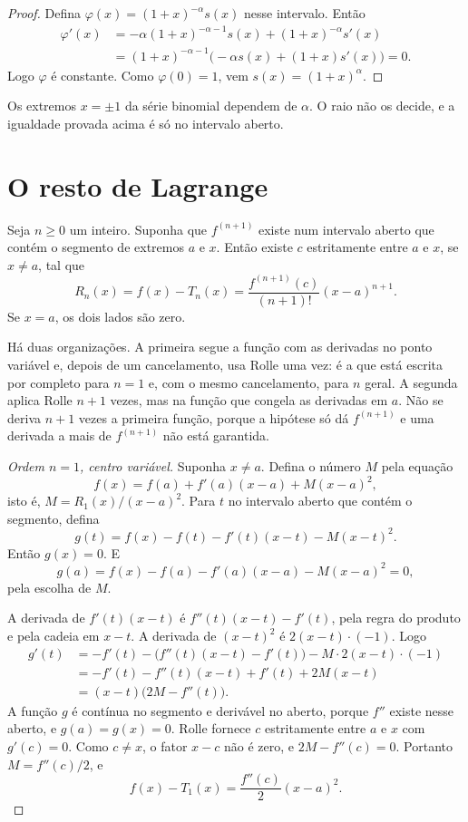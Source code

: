 \documentclass[11pt,a4paper]{article}
\begin{document}
\begin{proof}
Defina \(\varphi(x)=(1+x)^{-\alpha}s(x)\) nesse intervalo. Então
\begin{align*}
\varphi'(x)
&=-\alpha(1+x)^{-\alpha-1}s(x)+(1+x)^{-\alpha}s'(x)\\
&=(1+x)^{-\alpha-1}\bigl(-\alpha s(x)+(1+x)s'(x)\bigr)
=0.
\end{align*}
Logo \(\varphi\) é constante. Como \(\varphi(0)=1\), vem \(s(x)=(1+x)^\alpha\).
\end{proof}

Os extremos \(x=\pm 1\) da série binomial dependem de \(\alpha\). O raio não os decide, e a igualdade provada acima é só no intervalo aberto.

\section{O resto de Lagrange}

\begin{teorema}
\label{thm:lagrange}
Seja \(n\ge 0\) um inteiro. Suponha que \(f^{(n+1)}\) existe num intervalo aberto que contém o segmento de extremos \(a\) e \(x\). Então existe \(c\) estritamente entre \(a\) e \(x\), se \(x\neq a\), tal que
\[
R_n(x)=f(x)-T_n(x)=\frac{f^{(n+1)}(c)}{(n+1)!}(x-a)^{n+1}.
\]
Se \(x=a\), os dois lados são zero.
\end{teorema}

Há duas organizações. A primeira segue a função com as derivadas no ponto variável e, depois de um cancelamento, usa Rolle uma vez: é a que está escrita por completo para \(n=1\) e, com o mesmo cancelamento, para \(n\) geral. A segunda aplica Rolle \(n+1\) vezes, mas na função que congela as derivadas em \(a\). Não se deriva \(n+1\) vezes a primeira função, porque a hipótese só dá \(f^{(n+1)}\) e uma derivada a mais de \(f^{(n+1)}\) não está garantida.

\begin{proof}[Ordem \(n=1\), centro variável]
Suponha \(x\neq a\). Defina o número \(M\) pela equação
\[
f(x)=f(a)+f'(a)(x-a)+M(x-a)^2,
\]
isto é, \(M=R_1(x)/(x-a)^2\). Para \(t\) no intervalo aberto que contém o segmento, defina
\[
g(t)=f(x)-f(t)-f'(t)(x-t)-M(x-t)^2.
\]
Então \(g(x)=0\). E
\[
g(a)=f(x)-f(a)-f'(a)(x-a)-M(x-a)^2=0,
\]
pela escolha de \(M\).

A derivada de \(f'(t)(x-t)\) é \(f''(t)(x-t)-f'(t)\), pela regra do produto e pela cadeia em \(x-t\). A derivada de \((x-t)^2\) é \(2(x-t)\cdot(-1)\). Logo
\begin{align*}
g'(t)
&=-f'(t)-\bigl(f''(t)(x-t)-f'(t)\bigr)-M\cdot 2(x-t)\cdot(-1)\\
&=-f'(t)-f''(t)(x-t)+f'(t)+2M(x-t)\\
&=(x-t)\bigl(2M-f''(t)\bigr).
\end{align*}
A função \(g\) é contínua no segmento e derivável no aberto, porque \(f''\) existe nesse aberto, e \(g(a)=g(x)=0\). Rolle fornece \(c\) estritamente entre \(a\) e \(x\) com \(g'(c)=0\). Como \(c\neq x\), o fator \(x-c\) não é zero, e \(2M-f''(c)=0\). Portanto \(M=f''(c)/2\), e
\[
f(x)-T_1(x)=\frac{f''(c)}{2}(x-a)^2.
\]
\end{proof}
\end{document}
